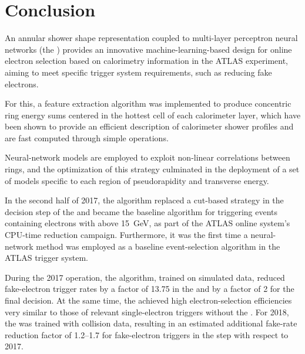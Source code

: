 \section{Conclusion}\label{sec:conclusion}



An annular shower shape representation coupled to multi-layer perceptron neural networks (the \rnn{}) provides an innovative machine-learning-based design for online electron selection based on calorimetry information in the ATLAS experiment, aiming to meet specific trigger system requirements, such as reducing fake electrons.

For this, a feature extraction algorithm was implemented to produce
concentric ring energy sums centered in the hottest cell of each calorimeter layer, which have been shown to provide an efficient description of calorimeter shower profiles and are fast computed through simple operations. 

Neural-network models are employed to exploit non-linear correlations between rings, and the optimization of this strategy 
culminated in the deployment of a set of models specific to each region of pseudorapidity and transverse energy. 


In the second half of 2017, the \rnn{} algorithm replaced a cut-based strategy in the \fastcalo{} decision step of the \hlt{} and became the baseline algorithm for triggering events containing electrons with \ET above \SI{15}{\GeV}, as part of the ATLAS online system's CPU-time reduction campaign. Furthermore, it was the first time a neural-network method was employed as a baseline event-selection algorithm in the ATLAS trigger system.


During the 2017 operation, the \rnn{} algorithm, trained on simulated data, reduced fake-electron trigger rates by a factor of 13.75 in the \fastcalo{} and by a factor of 2 for the \hlt{} final decision. At the same time, the \rnn{} achieved high electron-selection efficiencies very similar to those of relevant single-electron triggers without the \rnn{}. For 2018, the \rnn{} was trained with collision data, resulting in an estimated additional fake-rate reduction factor of 1.2--1.7 for fake-electron triggers in the \fastcalo{} step with respect to 2017. 


